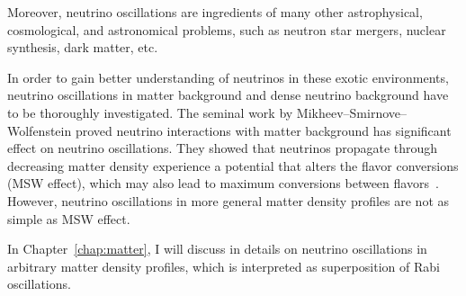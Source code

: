 Moreover, neutrino oscillations are ingredients of many other astrophysical, cosmological, and astronomical problems, such as neutron star mergers, nuclear synthesis, dark matter, etc. 

In order to gain better understanding of neutrinos in these exotic environments, neutrino oscillations in matter background and dense neutrino background have to be thoroughly investigated. The seminal work by Mikheev--Smirnove--Wolfenstein proved neutrino interactions with matter background has significant effect on neutrino oscillations. They showed that neutrinos propagate through decreasing matter density experience a potential that alters the flavor conversions (MSW effect), which may also lead to maximum conversions between flavors~\cite{Mikheev:1986gs,wolf78,wolfensteinprd1979}. However, neutrino oscillations in more general matter density profiles are not as simple as MSW effect. 

In Chapter~\ref{chap:matter}, I will discuss in details on neutrino oscillations in arbitrary matter density profiles, which is interpreted as superposition of Rabi oscillations.